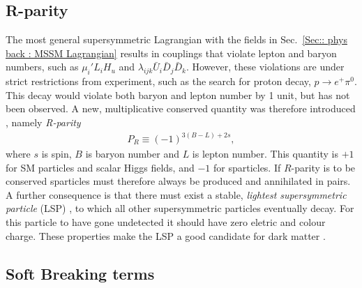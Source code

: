 \documentclass[twoside,english]{uiofysmaster}
\begin{document}
{\subsection{R-parity}\label{Sec:: phys back : R-parity}

The most general supersymmetric Lagrangian with the fields in Sec.~\ref{Sec:: phys back : MSSM Lagrangian} results in couplings that violate lepton and baryon numbers, such as $\mu_i' L_i H_u$ and $ \lambda_{ijk} \bar{U}_i \bar{D}_j \bar{D}_k $. However, these violations are under strict restrictions from experiment, such as the search for proton decay, $p \rightarrow e^+ \pi^0$. This decay would violate both baryon and lepton number by 1 unit, but has not been observed. A new, multiplicative conserved quantity was therefore introduced \cite{Farrar:1978xj}, namely \textit{R-parity} 
\begin{align}\label{Eq:: R-parity}
P_R \equiv (-1)^{3(B-L) +2s},
\end{align}
where $s$ is spin, $B$ is baryon number and $L$ is lepton number. This quantity is $+1$ for SM particles and scalar Higgs fields, and $-1$ for sparticles. If $R$-parity is to be conserved sparticles must therefore always be produced and annihilated in pairs. A further consequence is that there must exist a stable, \textit{lightest supersymmetric particle} (LSP) , to which all other supersymmetric particles eventually decay. For this particle to have gone undetected it should have zero eletric and colour charge. These properties make the LSP a good candidate for dark matter \cite{Weinberg:1995mt}.

\subsection{Soft Breaking terms}\label{Sec:: phys back : Soft breaking terms}

}
\end{document}
